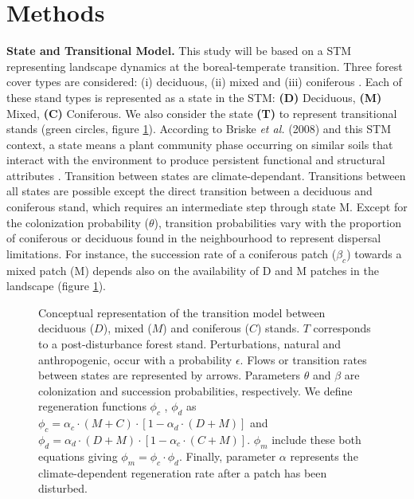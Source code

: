 \section{Methods}   

\textbf{State and Transitional Model.} This study will be based on a STM
representing landscape dynamics at the boreal-temperate transition. Three
forest cover types are considered: (i) deciduous, (ii) mixed and (iii)
coniferous \cite{Fisichelli2013}.  Each of these stand types is represented as
a state in the STM: \textbf{(D)} Deciduous, \textbf{(M)} Mixed, \textbf{(C)}
Coniferous. We also consider the state \textbf{(T)} to represent transitional
stands (green circles, figure \ref{Model}).  According to Briske\textit{ et
al.} (2008) and this STM context, a state means a plant community phase
occurring on similar soils that interact with the environment to produce
persistent functional and structural attributes \cite{Briske2008}. Transition
between states are climate-dependant. Transitions between all states are
possible except the direct transition between a deciduous and coniferous
stand, which requires an intermediate step through state M. Except for the
colonization probability ($\theta$), transition probabilities vary with the
proportion of coniferous or deciduous found in the  neighbourhood to represent
dispersal limitations. For instance, the succession rate of a coniferous patch
($\beta_c$) towards a mixed patch (M) depends also on the availability of D
and M patches in the landscape (figure \ref{Model}).  \\

\begin{figure}
	
	\caption{Conceptual representation of the transition model between deciduous ($D$),
	mixed ($M$) and coniferous ($C$) stands. $T$ corresponds to a post-disturbance forest stand. Perturbations, natural and anthropogenic, occur with a probability $\epsilon$. 
	Flows or transition rates between states are represented by arrows.
	Parameters $\theta$ and $\beta$ are  colonization and succession probabilities,
	respectively. We define regeneration functions $\phi_c$ , $\phi_d$ as $\phi_c
	= \alpha_c \cdot (M+C) \cdot [1- \alpha_d \cdot (D+M)]$ and $\phi_d =
	\alpha_d \cdot (D+M) \cdot [1- \alpha_c \cdot (C+M)]$. $\phi_m$ include these both equations giving $\phi_m = \phi_c \cdot \phi_d$. Finally, parameter $\alpha$ represents the climate-dependent regeneration rate after a patch has been disturbed.}
	\label{Model}
	\vspace{1em}
\end{figure}

